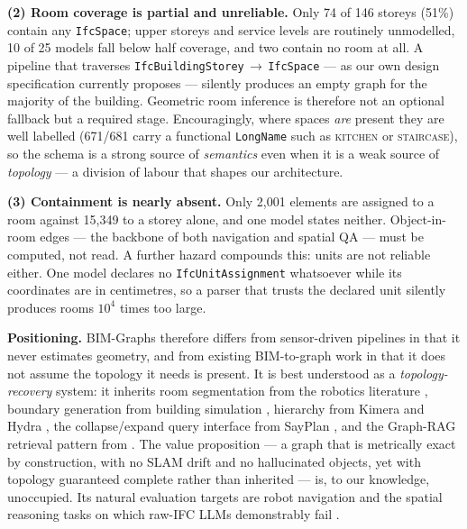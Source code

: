 \documentclass[10pt,twocolumn,letterpaper]{article}
\begin{document}
\medskip\noindent\textbf{(2) Room coverage is partial and unreliable.} Only 74 of
146 storeys (51\%) contain any \texttt{IfcSpace}; upper storeys and service
levels are routinely unmodelled, 10 of 25 models fall below half coverage, and
two contain no room at all. A pipeline that traverses
\texttt{IfcBuildingStorey}\,$\rightarrow$\,\texttt{IfcSpace} --- as our own design
specification currently proposes --- silently produces an empty graph for the
majority of the building. Geometric room inference is therefore not an optional
fallback but a required stage. Encouragingly, where spaces \emph{are} present
they are well labelled (671/681 carry a functional \texttt{LongName} such as
\textsc{kitchen} or \textsc{staircase}), so the schema is a strong source of
\emph{semantics} even when it is a weak source of \emph{topology} --- a division
of labour that shapes our architecture.

\medskip\noindent\textbf{(3) Containment is nearly absent.} Only 2{,}001 elements
are assigned to a room against 15{,}349 to a storey alone, and one model states
neither. Object-in-room edges --- the backbone of both navigation and spatial QA
--- must be computed, not read. A further hazard compounds this: units are not
reliable either. One model declares no \texttt{IfcUnitAssignment} whatsoever
while its coordinates are in centimetres, so a parser that trusts the declared
unit silently produces rooms $10^4$ times too large.

\medskip\noindent\textbf{Positioning.} BIM-Graphs therefore differs from
sensor-driven pipelines \cite{hughes2022hydra,werby2024hovsg} in that it never
estimates geometry, and from existing BIM-to-graph work
\cite{zhu2025ifcgraph,gopee2023ifcnav} in that it does not assume the topology it
needs is present. It is best understood as a \emph{topology-recovery} system: it
inherits room segmentation from the robotics literature
\cite{bormann2016roomseg}, boundary generation from building simulation
\cite{lilis2017spaceboundary}, hierarchy from Kimera and Hydra
\cite{rosinol2021kimera,hughes2022hydra}, the collapse/expand query interface
from SayPlan \cite{rana2023sayplan}, and the Graph-RAG retrieval pattern from
\cite{iranmanesh2025graphrag}. The value proposition --- a graph that is metrically
exact by construction, with no SLAM drift and no hallucinated objects, yet with
topology guaranteed complete rather than inherited --- is, to our knowledge,
unoccupied. Its natural evaluation targets are robot navigation and the spatial
reasoning tasks on which raw-IFC LLMs demonstrably fail
\cite{nithyanantham2026bimedit}.
\end{document}
